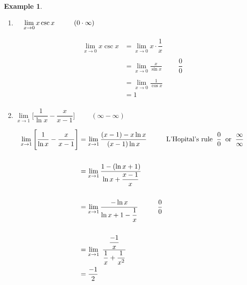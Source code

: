 \documentclass[11pt,a4paper]{article}
\theoremstyle{definition}
\newtheorem{exa}[thm]{Example}
\begin{document}
\begin{exa}
\begin{enumerate}
\item $\hspace{0.4cm} \lim\limits_{x\rightarrow 0} x \csc x\hspace{1cm} (0\cdot\infty)$

\begin{align*}
\lim\limits_{x\rightarrow 0} x \csc x & = \lim\limits_{x\rightarrow 0} x \cdot \dfrac{1}{x}\\\\
& = \lim\limits_{x\rightarrow 0}\frac{x}{\sin x}\hspace{1cm} \dfrac{0}{0}\\\\
& = \lim\limits_{x\rightarrow 0} \frac{1}{\cos x}\\
&= 1\\
\end{align*}

\item $\lim\limits_{x\rightarrow 1}\Bigg[\dfrac{1}{\ln x} - \dfrac{x}{x - 1}\Bigg]\hspace{1cm} (\infty - \infty)$

\begin{align*}
\lim\limits_{x\rightarrow 1}\Bigg[\dfrac{1}{\ln x} - \dfrac{x}{x - 1}\Bigg] & = \lim\limits_{x\rightarrow 1}\dfrac{(x - 1)- x \ln x}{(x-1)\ln x}\hspace{1cm} \text{L'Hopital's rule}\hspace{0.2cm} \dfrac{0}{0}\hspace{0.2cm} \text{or}\hspace{0.2cm} \dfrac{\infty}{\infty}\\\\
& = \lim\limits_{x\rightarrow 1}\dfrac{1- (\ln x + 1)}{\ln x + \dfrac {x-1}{x}}\\\\
& = \lim\limits_{x\rightarrow 1} \frac{-\ln x}{\ln x + 1 - \dfrac{1}{x}}\hspace{1cm} \dfrac{0}{0}\\\\
& = \lim\limits_{x\rightarrow 1}\hspace{0.1cm} \dfrac{\dfrac{-1}{x}}{\dfrac{1}{x} + \dfrac{1}{x^2}}\\\
& = \frac{-1}{2}\\\\
\end{align*}
\end{enumerate}
\end{exa}
\end{document}
